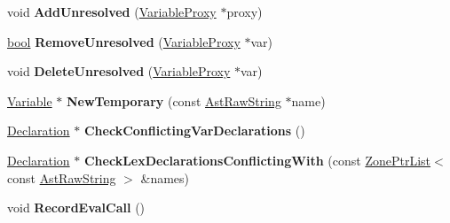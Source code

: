 \begin{DoxyCompactItemize}
\item 
\mbox{\label{classv8_1_1internal_1_1Scope_ad75331bcddcce8ba25956eff5085545f}} 
void {\bfseries Add\+Unresolved} (\mbox{\hyperlink{classv8_1_1internal_1_1VariableProxy}{Variable\+Proxy}} $\ast$proxy)
\item 
\mbox{\label{classv8_1_1internal_1_1Scope_a9c774461387c0fd7b64976bee066b6f8}} 
\mbox{\hyperlink{classbool}{bool}} {\bfseries Remove\+Unresolved} (\mbox{\hyperlink{classv8_1_1internal_1_1VariableProxy}{Variable\+Proxy}} $\ast$var)
\item 
\mbox{\label{classv8_1_1internal_1_1Scope_a62fcd4eadc4e5b0b15913b68be77ef18}} 
void {\bfseries Delete\+Unresolved} (\mbox{\hyperlink{classv8_1_1internal_1_1VariableProxy}{Variable\+Proxy}} $\ast$var)
\item 
\mbox{\label{classv8_1_1internal_1_1Scope_aac81b30a6d8592a48c2d05626bbab1ba}} 
\mbox{\hyperlink{classv8_1_1internal_1_1Variable}{Variable}} $\ast$ {\bfseries New\+Temporary} (const \mbox{\hyperlink{classv8_1_1internal_1_1AstRawString}{Ast\+Raw\+String}} $\ast$name)
\item 
\mbox{\label{classv8_1_1internal_1_1Scope_aca4da0b20082a008449bde02757d6358}} 
\mbox{\hyperlink{classv8_1_1internal_1_1Declaration}{Declaration}} $\ast$ {\bfseries Check\+Conflicting\+Var\+Declarations} ()
\item 
\mbox{\label{classv8_1_1internal_1_1Scope_abd8fbbadf38ff18dc3edec4457400f0b}} 
\mbox{\hyperlink{classv8_1_1internal_1_1Declaration}{Declaration}} $\ast$ {\bfseries Check\+Lex\+Declarations\+Conflicting\+With} (const \mbox{\hyperlink{classv8_1_1internal_1_1ZoneList}{Zone\+Ptr\+List}}$<$ const \mbox{\hyperlink{classv8_1_1internal_1_1AstRawString}{Ast\+Raw\+String}} $>$ \&names)
\item 
\mbox{\label{classv8_1_1internal_1_1Scope_abb725bce049d5b79020961a7d01154d7}} 
void {\bfseries Record\+Eval\+Call} ()
\item 
\mbox{\label{classv8_1_1internal_1_1Scope_a05698affe1b09ec1c3b88dd91ce28e60}} 

\end{DoxyCompactItemize}

